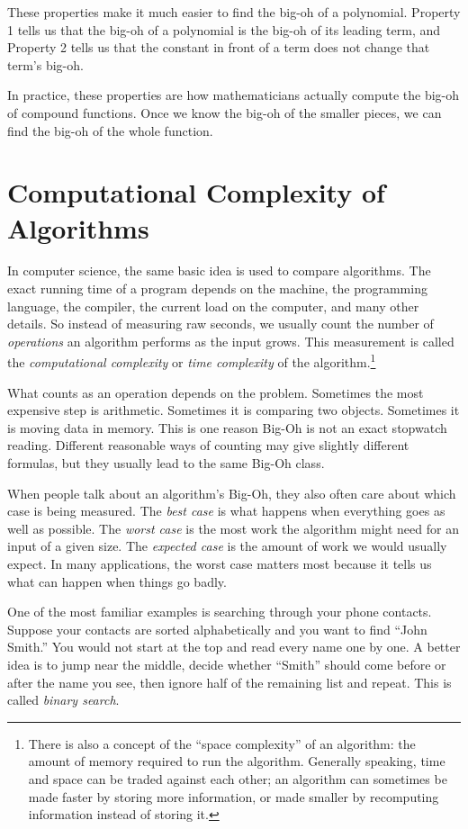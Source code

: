 \documentclass[11pt,oneside]{book}
\theoremstyle{definition}
\begin{document}
These properties make it much easier to find the big-oh of a polynomial.
Property 1 tells us that the big-oh of a polynomial is the big-oh of its leading term, and Property 2 tells us that the constant in front of a term does not change that term's big-oh.

In practice, these properties are how mathematicians actually compute the big-oh of compound functions.
Once we know the big-oh of the smaller pieces, we can find the big-oh of the whole function.


\section{Computational Complexity of Algorithms}
In computer science, the same basic idea is used to compare algorithms.
The exact running time of a program depends on the machine, the programming language, the compiler, the current load on the computer, and many other details.
So instead of measuring raw seconds, we usually count the number of \emph{operations} an algorithm performs as the input grows.
This measurement is called the \emph{computational complexity} or \emph{time complexity} of the algorithm.\footnote{
    There is also a concept of the ``space complexity'' of an algorithm: the amount of memory required to run the algorithm.
    Generally speaking, time and space can be traded against each other; an algorithm can sometimes be made faster by storing more information, or made smaller by recomputing information instead of storing it.
}

What counts as an operation depends on the problem.
Sometimes the most expensive step is arithmetic.
Sometimes it is comparing two objects.
Sometimes it is moving data in memory.
This is one reason Big-Oh is not an exact stopwatch reading.
Different reasonable ways of counting may give slightly different formulas, but they usually lead to the same Big-Oh class.

When people talk about an algorithm's Big-Oh, they also often care about which case is being measured.
The \emph{best case} is what happens when everything goes as well as possible.
The \emph{worst case} is the most work the algorithm might need for an input of a given size.
The \emph{expected case} is the amount of work we would usually expect.
In many applications, the worst case matters most because it tells us what can happen when things go badly.

One of the most familiar examples is searching through your phone contacts.
Suppose your contacts are sorted alphabetically and you want to find ``John Smith.''
You would not start at the top and read every name one by one.
A better idea is to jump near the middle, decide whether ``Smith'' should come before or after the name you see, then ignore half of the remaining list and repeat.
This is called \emph{binary search}.
\end{document}
